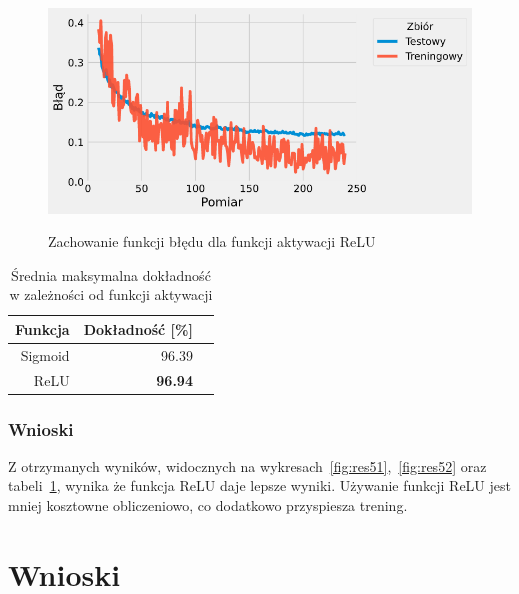 \documentclass{article}
\begin{document}
\begin{figure}[H]
	\centering
	\caption{Zachowanie funkcji błędu dla funkcji aktywacji ReLU}
	\includegraphics[width=\textwidth]{activation_err_relu.png}
	\label{fig:res54}
\end{figure}

\begin{table}[H]
	\caption{Średnia maksymalna dokładność w zależności od funkcji aktywacji}
	\label{tabela-res-51}
	\centering
	\begin{tabular}{rrr}
		\toprule
		Funkcja & Dokładność [\%] \\
		\midrule
		Sigmoid & 96.39              \\
		ReLU    & \textbf{96.94}     \\
		\bottomrule
	\end{tabular}
\end{table}

\subsubsection*{Wnioski}

Z otrzymanych wyników, widocznych na wykresach~\ref{fig:res51},~\ref{fig:res52} oraz tabeli~\ref{tabela-res-51}, wynika że funkcja ReLU daje lepsze wyniki. Używanie funkcji ReLU jest mniej kosztowne obliczeniowo, co dodatkowo przyspiesza trening.


\newpage
\section{Wnioski}
\end{document}
